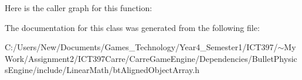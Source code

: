 Here is the caller graph for this function:

The documentation for this class was generated from the following file:\begin{CompactItemize}
\item 
C:/Users/New/Documents/Games\_\-Technology/Year4\_\-Semester1/ICT397/$\sim$My Work/Assignment2/ICT397Carre/CarreGameEngine/Dependencies/BulletPhysicsEngine/include/LinearMath/btAlignedObjectArray.h\end{CompactItemize}
